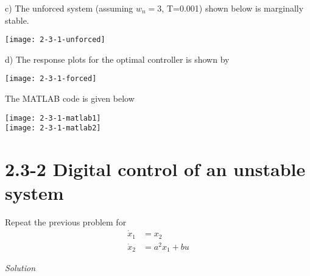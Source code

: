 \documentclass{article}
\begin{document}
  c) The unforced system (assuming $w_n=3$, T=0.001) shown below is marginally stable. \newline
  \begin{center}
  \texttt{[image: 2-3-1-unforced]}
  \end{center}

  d) The response plots for the optimal controller is shown by
  \begin{center}
  \texttt{[image: 2-3-1-forced]}
  \end{center}

  \newpage The MATLAB code is given below
  \begin{center}
  \texttt{[image: 2-3-1-matlab1]} \\
  \texttt{[image: 2-3-1-matlab2]}
  \end{center}


  \newpage

  \section{2.3-2 Digital control of an unstable system}

  Repeat the previous problem for
  \begin{align*}
	  \dot{x}_1&=x_2 \tag{3.1} \\
	  \dot{x}_2&=a^2x_1+bu \tag{3.2}
  \end{align*}

  \noindent \textit{Solution} \newline \newline
\end{document}
